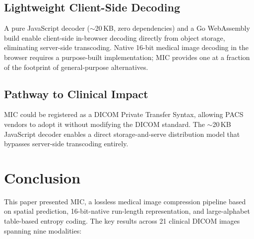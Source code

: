 \documentclass[journal]{IEEEtran}
\begin{document}
\subsection{Lightweight Client-Side Decoding}

A pure JavaScript decoder (${\sim}$20\,KB, zero dependencies) and a Go
WebAssembly build enable client-side in-browser decoding directly from object
storage, eliminating server-side transcoding. Native 16-bit medical image
decoding in the browser requires a purpose-built implementation; MIC provides
one at a fraction of the footprint of general-purpose alternatives.

\subsection{Pathway to Clinical Impact}

MIC could be registered as a DICOM Private Transfer Syntax, allowing PACS
vendors to adopt it without modifying the DICOM standard. The ${\sim}$20\,KB
JavaScript decoder enables a direct storage-and-serve distribution model that
bypasses server-side transcoding entirely.

\section{Conclusion}
\label{sec:conclusion}

This paper presented MIC, a lossless medical image compression pipeline based on
spatial prediction, 16-bit-native run-length representation, and large-alphabet
table-based entropy coding. The key results across 21 clinical DICOM images
spanning nine modalities:
\end{document}
